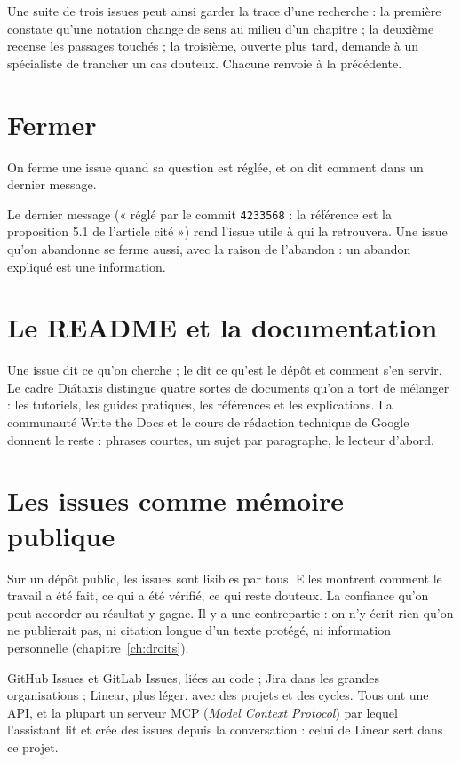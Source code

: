 \begin{exemple}
Une suite de trois issues peut ainsi garder la trace d'une recherche : la première constate
qu'une notation change de sens au milieu d'un chapitre ; la deuxième recense les passages
touchés ; la troisième, ouverte plus tard, demande à un spécialiste de trancher un cas
douteux. Chacune renvoie à la précédente.
\end{exemple}

\section{Fermer}

\begin{regle}
On ferme une issue quand sa question est réglée, et on dit comment dans un dernier
message.
\end{regle}

Le dernier message (« réglé par le commit \texttt{4233568} : la référence est la
proposition 5.1 de l'article cité ») rend l'issue utile à qui la retrouvera. Une issue
qu'on abandonne se ferme aussi, avec la raison de l'abandon : un abandon expliqué est une
information.

\section{Le README et la documentation}

Une issue dit ce qu'on cherche ; le  dit ce qu'est le dépôt et comment s'en
servir. Le cadre Diátaxis distingue quatre sortes de documents qu'on a tort de mélanger :
les tutoriels, les guides pratiques, les références et les explications. La communauté
Write the Docs et le cours de rédaction technique de Google donnent le reste : phrases
courtes, un sujet par paragraphe, le lecteur d'abord.

\section{Les issues comme mémoire publique}

Sur un dépôt public, les issues sont lisibles par tous. Elles montrent comment le travail a
été fait, ce qui a été vérifié, ce qui reste douteux. La confiance
qu'on peut accorder au résultat y gagne. Il y a une contrepartie : on n'y écrit rien qu'on ne
publierait pas, ni citation longue d'un texte protégé, ni information personnelle
(chapitre~\ref{ch:droits}).

\begin{outils}
GitHub Issues et GitLab Issues, liées au code ; Jira dans les grandes organisations ;
Linear, plus léger, avec des projets et des cycles. Tous ont une API, et la plupart un serveur
MCP (\emph{Model Context Protocol}) par lequel l'assistant lit et crée des issues
depuis la conversation : celui de Linear sert dans ce projet.
\end{outils}
